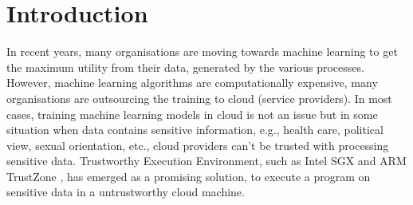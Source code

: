 \documentclass[sigplan,screen]{acmart}
\begin{document}
\begin{comment}
\begin{CCSXML}
<ccs2012>
 <concept>
  <concept_id>10010520.10010553.10010562</concept_id>
  <concept_desc>Computer systems organization~Embedded systems</concept_desc>
  <concept_significance>500</concept_significance>
 </concept>
 <concept>
  <concept_id>10010520.10010575.10010755</concept_id>
  <concept_desc>Computer systems organization~Redundancy</concept_desc>
  <concept_significance>300</concept_significance>
 </concept>
 <concept>
  <concept_id>10010520.10010553.10010554</concept_id>
  <concept_desc>Computer systems organization~Robotics</concept_desc>
  <concept_significance>100</concept_significance>
 </concept>
 <concept>
  <concept_id>10003033.10003083.10003095</concept_id>
  <concept_desc>Networks~Network reliability</concept_desc>
  <concept_significance>100</concept_significance>
 </concept>
</ccs2012>
\end{CCSXML}

\ccsdesc[500]{Computer systems organization~Embedded systems}
\ccsdesc[300]{Computer systems organization~Redundancy}
\ccsdesc{Computer systems organization~Robotics}
\ccsdesc[100]{Networks~Network reliability}
\end{comment}




\maketitle

\section{Introduction}

 In recent years, many organisations are moving towards machine learning to get 
 the maximum utility from their data, generated by the various processes. 
 However, machine learning algorithms are computationally expensive, 
 many organisations are outsourcing the training to cloud (service providers). 
 In most cases, training machine learning models in cloud is not 
 an issue but in some situation when data contains sensitive information, e.g., health care, 
 political view, sexual orientation, etc., cloud providers can't be trusted with 
 processing sensitive data. Trustworthy Execution Environment, such as Intel 
 SGX \cite{10.1145/2487726.2488368}  and ARM TrustZone \cite{alves2004trustzone}, 
 has emerged as a promising solution, to execute a program on sensitive data in 
 a untrustworthy cloud machine. 
 
\end{document}
